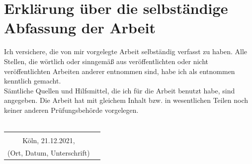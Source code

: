 \documentclass[a4paper,12pt,oneside]{article}
\begin{document}
\pagestyle{empty}
\section*{Erklärung über die selbständige\\Abfassung der Arbeit} %
Ich versichere, die von mir vorgelegte Arbeit selbständig verfasst zu haben.
Alle Stellen, die wörtlich oder sinngemäß aus veröffentlichten oder nicht veröffentlichten Arbeiten anderer entnommen sind,
habe ich als entnommen kenntlich gemacht.\\
Sämtliche Quellen und Hilfsmittel, die ich für die Arbeit benutzt habe, sind
angegeben. Die Arbeit hat mit gleichem Inhalt bzw. in wesentlichen Teilen noch keiner anderen Prüfungsbehörde vorgelegen.\\\\
\begin{tabular}{cp{7cm}}
                                    &             \\
      Köln, 21.12.2021,       &             \\ \hline
  \small (Ort, Datum, Unterschrift) & \normalsize \\
\end{tabular}
   

\newpage
\thispagestyle{empty}

\end{document}
